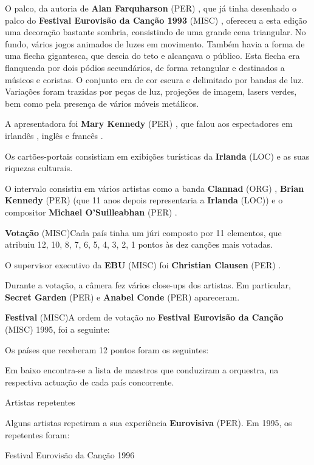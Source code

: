 \documentclass[12pt,a4paper]{article}
\begin{document}
O palco, da autoria de \textbf{Alan Farquharson} (PER) , que já tinha desenhado o palco do \textbf{Festival Eurovisão da Canção 1993} (MISC) , ofereceu a esta edição uma decoração bastante sombria, consistindo de uma grande cena triangular. No fundo, vários jogos animados de luzes em movimento. Também havia a forma de uma flecha gigantesca, que descia do teto e alcançava o público. Esta flecha era flanqueada por dois pódios secundários, de forma retangular e destinados a músicos e coristas. O conjunto era de cor escura e delimitado por bandas de luz. Variações foram trazidas por peças de luz, projeções de imagem, lasers verdes, bem como pela presença de vários móveis metálicos.

A apresentadora foi \textbf{Mary Kennedy} (PER) , que falou aos espectadores em irlandês , inglês e francês .

Os cartões-portais consistiam em exibições turísticas da \textbf{Irlanda} (LOC) e as suas riquezas culturais.

O intervalo consistiu em vários artistas como a banda \textbf{Clannad} (ORG) , \textbf{Brian Kennedy} (PER) (que 11 anos depois representaria a \textbf{Irlanda} (LOC)) e o compositor \textbf{Michael O'Suilleabhan} (PER) .



\textbf{Votação} (MISC)Cada país tinha um júri composto por 11 elementos, que atribuiu 12, 10, 8, 7, 6, 5, 4, 3, 2, 1 pontos às dez canções mais votadas.

O supervisor executivo da \textbf{EBU} (MISC) foi \textbf{Christian Clausen} (PER) .

Durante a votação, a câmera fez vários close-ups dos artistas. Em particular, \textbf{Secret Garden} (PER) e \textbf{Anabel Conde} (PER) apareceram.



\textbf{Festival} (MISC)A ordem de votação no \textbf{Festival Eurovisão da Canção} (MISC) 1995, foi a seguinte:

Os países que receberam 12 pontos foram os seguintes:

Em baixo encontra-se a lista de maestros que conduziram a orquestra, na respectiva actuação de cada país concorrente.



Artistas repetentes

Alguns artistas repetiram a sua experiência \textbf{Eurovisiva} (PER). Em 1995, os repetentes foram:



Festival Eurovisão da Canção 1996
\end{document}
